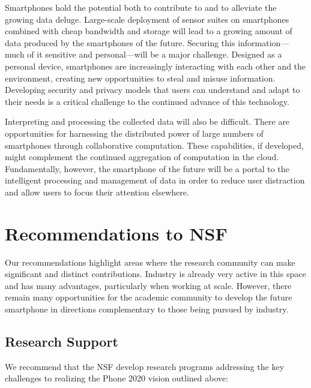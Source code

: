 Smartphones hold the potential both to contribute to and to alleviate the
growing data deluge. Large-scale deployment of sensor suites on smartphones
combined with cheap bandwidth and storage will lead to a growing amount of
data produced by the smartphones of the future. Securing this
information---much of it sensitive and personal---will be a major challenge.
Designed as a personal device, smartphones are increasingly interacting with
each other and the environment, creating new opportunities to steal and
misuse information. Developing security and privacy models that users can
understand and adapt to their needs is a critical challenge to the continued
advance of this technology.
 
Interpreting and processing the collected data will also be difficult. There
are opportunities for harnessing the distributed power of large numbers of
smartphones through collaborative computation. These capabilities, if
developed, might complement the continued aggregation of computation in the
cloud. Fundamentally, however, the smartphone of the future will be a portal
to the intelligent processing and management of data in order to reduce user
distraction and allow users to focus their attention elsewhere.

\section{Recommendations to NSF}

Our recommendations highlight areas where the research community can make
significant and distinct contributions. Industry is already very active in
this space and has many advantages, particularly when working at scale.
However, there remain many opportunities for the academic community to
develop the future smartphone in directions complementary to those being
pursued by industry.

\subsection{Research Support}

We recommend that the NSF develop research programs addressing the key
challenges to realizing the Phone 2020 vision outlined above:

